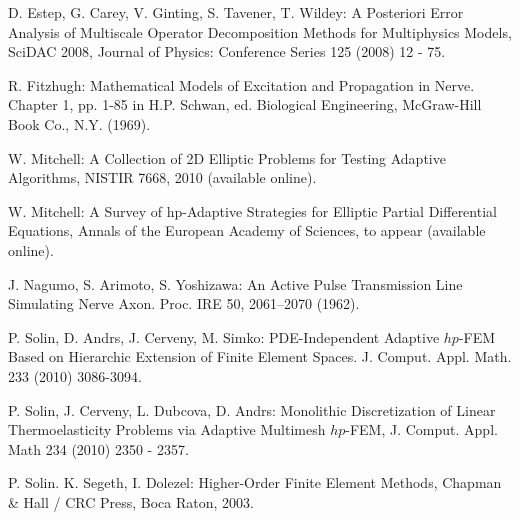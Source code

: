 \documentclass[12pt]{elsarticle}
\begin{document}
\begin{thebibliography}{[KLR73]}
%
%
%

D. Estep, G. Carey, V. Ginting, S. Tavener, T. Wildey:
A Posteriori Error Analysis of Multiscale Operator
Decomposition Methods for Multiphysics Models, SciDAC 2008,
Journal of Physics: Conference Series 125 (2008) 12 - 75.

R. Fitzhugh: Mathematical Models of Excitation and Propagation in Nerve.
Chapter 1, pp. 1-85 in H.P. Schwan, ed. Biological Engineering,
McGraw-Hill Book Co., N.Y. (1969).

W. Mitchell: A Collection of 2D Elliptic Problems for
Testing Adaptive Algorithms, NISTIR 7668, 2010 (available online).

W. Mitchell: A Survey of hp-Adaptive Strategies for Elliptic Partial Differential Equations,
Annals of the European Academy of Sciences, to appear (available online).

J. Nagumo, S. Arimoto, S. Yoshizawa:
An Active Pulse Transmission Line Simulating Nerve Axon. Proc. IRE 50, 2061–2070 (1962).

P. Solin, D. Andrs, J. Cerveny, M. Simko:
PDE-Independent Adaptive $hp$-FEM Based on Hierarchic Extension of Finite Element Spaces.
J. Comput. Appl. Math. 233 (2010) 3086-3094.


P. Solin, J. Cerveny, L. Dubcova, D. Andrs:
Monolithic Discretization of Linear Thermoelasticity Problems
via Adaptive Multimesh $hp$-FEM, J. Comput. Appl. Math 234 (2010) 2350 - 2357.

P. Solin. K. Segeth, I. Dolezel: Higher-Order Finite Element Methods, Chapman \& Hall
/ CRC Press, Boca Raton, 2003.

%
%

\end{thebibliography}
\end{document}
